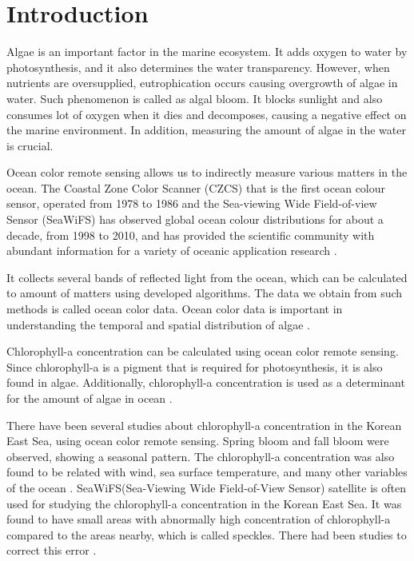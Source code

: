 \section{Introduction}

Algae is an important factor in the marine ecosystem. It adds oxygen to water by photosynthesis, and it also determines the water transparency. However, when nutrients are oversupplied, eutrophication occurs causing overgrowth of algae in water. Such phenomenon is called as algal bloom. It blocks sunlight and also consumes lot of oxygen when it dies and decomposes, causing a negative effect on the marine environment. In addition, measuring the amount of algae in the water is crucial.

Ocean color remote sensing allows us to indirectly measure various matters in the ocean. The Coastal Zone Color Scanner (CZCS) that is the first ocean colour sensor, operated from 1978 to 1986 and the Sea-viewing Wide Field-of-view Sensor (SeaWiFS) has observed global ocean colour distributions for about a decade, from 1998 to 2010, and has provided the scientific community with abundant information for a variety of oceanic application research \cite{kyung2013characteristics, hooker1992An}.

It collects several bands of reflected light from the ocean, which can be calculated to amount of matters using developed algorithms. The data we obtain from such methods is called ocean color data. Ocean color data is important in understanding the temporal and spatial distribution of algae \cite{kimhc2016surface}.

Chlorophyll-a concentration can be calculated using ocean color remote sensing. Since chlorophyll-a is a pigment that is required for photosynthesis, it is also found in algae. Additionally, chlorophyll-a concentration is used as a determinant for the amount of algae in ocean \cite{o2000ocean}. 

There have been several studies about chlorophyll-a concentration in the Korean East Sea, using ocean color remote sensing. Spring bloom and fall bloom were observed, showing a seasonal pattern. The chlorophyll-a concentration was also found to be related with wind, sea surface temperature, and many other variables of the ocean \cite{yamada2004seasonal}. SeaWiFS(Sea-Viewing Wide Field-of-View Sensor) satellite is often used for studying the chlorophyll-a concentration in the Korean East Sea. It was found to have small areas with abnormally high concentration of chlorophyll-a compared to the areas nearby, which is called speckles. There had been studies to correct this error \cite{chae2009characteristics}. 

